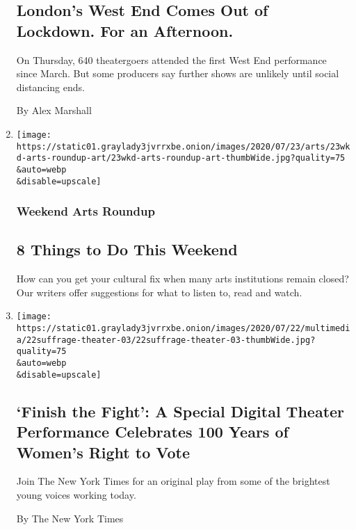 \begin{enumerate}
  \hypertarget{londons-west-end-comes-out-of-lockdown-for-an-afternoon}{%
  \subsection{London's West End Comes Out of Lockdown. For an
  Afternoon.}\label{londons-west-end-comes-out-of-lockdown-for-an-afternoon}}

  On Thursday, 640 theatergoers attended the first West End performance
  since March. But some producers say further shows are unlikely until
  social distancing ends.

  By Alex Marshall
\item
  \href{/2020/07/23/arts/things-to-do-weekend-coronavirus.html}{}

  \texttt{[image: https://static01.graylady3jvrrxbe.onion/images/2020/07/23/arts/23wkd-arts-roundup-art/23wkd-arts-roundup-art-thumbWide.jpg?quality=75\\\&auto=webp\\\&disable=upscale]}

  \hypertarget{weekend-arts-roundup}{%
  \subsubsection{Weekend Arts Roundup}\label{weekend-arts-roundup}}

  \hypertarget{8-things-to-do-this-weekend}{%
  \subsection{8 Things to Do This
  Weekend}\label{8-things-to-do-this-weekend}}

  How can you get your cultural fix when many arts institutions remain
  closed? Our writers offer suggestions for what to listen to, read and
  watch.
\item
  \href{/2020/07/23/theater/finish-the-fight-suffrage-centennial-performance.html}{}

  \texttt{[image: https://static01.graylady3jvrrxbe.onion/images/2020/07/22/multimedia/22suffrage-theater-03/22suffrage-theater-03-thumbWide.jpg?quality=75\\\&auto=webp\\\&disable=upscale]}

  \hypertarget{finish-the-fight-a-special-digital-theater-performance-celebrates-100-years-of-womens-right-to-vote}{%
  \subsection{`Finish the Fight': A Special Digital Theater Performance
  Celebrates 100 Years of Women's Right to
  Vote}\label{finish-the-fight-a-special-digital-theater-performance-celebrates-100-years-of-womens-right-to-vote}}

  Join The New York Times for an original play from some of the
  brightest young voices working today.

  By The New York Times
\end{enumerate}

